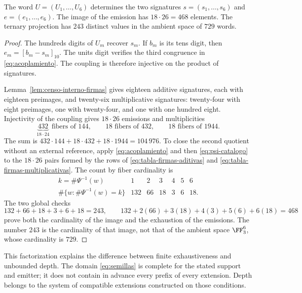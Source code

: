 \begin{proposition}
\label{prop:factorizacion-emision-interna}
The word \(U=(U_1,\ldots,U_6)\) determines the two signatures \(s=(s_1,\ldots,s_6)\) and \(e=(e_1,\ldots,e_6)\). The image of the emission has \(18\cdot26=468\) elements. The ternary projection has \(243\) distinct values in the ambient space of \(729\) words.
\end{proposition}
\begin{proof}
The hundreds digits of \(U_m\) recover \(s_m\). If \(b_m\) is its tens digit, then \(e_m=[b_m-s_m]_{10}\). The units digit verifies the third congruence in \eqref{eq:acoplamiento}. The coupling is therefore injective on the product of signatures.

Lemma~\ref{lem:censo-interno-firmas} gives eighteen additive signatures, each
with eighteen preimages, and twenty-six multiplicative signatures: twenty-four with
eight preimages, one with twenty-four, and one with one hundred eight. Injectivity
of the coupling gives \(18\cdot26\) emissions and multiplicities
\[
 \underbrace{432}_{18\cdot24}\text{ fibers of }144,
 \qquad18\text{ fibers of }432,
 \qquad18\text{ fibers of }1944.
\]
The sum is \(432\cdot144+18\cdot432+18\cdot1944=104\,976\). To close
the second quotient without an external reference, apply
\eqref{eq:acoplamiento} and then \eqref{eq:psi-catalogo} to the
\(18\cdot26\) pairs formed by the rows of
\eqref{eq:tabla-firmas-aditivas} and
\eqref{eq:tabla-firmas-multiplicativas}. The count by fiber cardinality is
\[
\begin{array}{c|rrrrrr}
k=\#\Psi^{-1}(w)&1&2&3&4&5&6\\ \hline
\#\{w:\#\Psi^{-1}(w)=k\}&132&66&18&3&6&18.
\end{array}
\tag{C}
\label{eq:histograma-proyeccion-ternaria}
\]
The two global checks
\[
132+66+18+3+6+18=243,
\qquad
132+2(66)+3(18)+4(3)+5(6)+6(18)=468
\]
prove both the cardinality of the image and the exhaustion of the emissions.
The number \(243\) is the cardinality of that image, not that of the ambient space
\(\FF_3^6\), whose cardinality is \(729\).
\end{proof}

This factorization explains the difference between finite exhaustiveness and unbounded depth. The domain \eqref{eq:semillas} is complete for the stated support and emitter; it does not contain in advance every prefix of every extension. Depth belongs to the system of compatible extensions constructed on those conditions.

